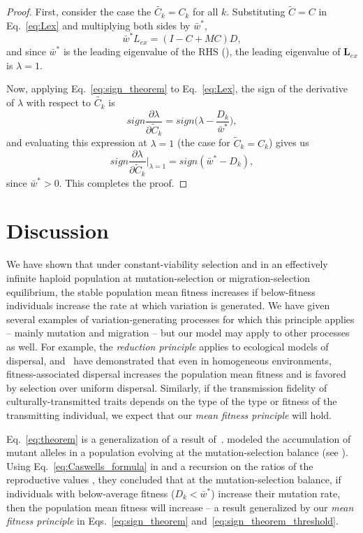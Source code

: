 \documentclass[9pt, a4paper, twocolumn]{extarticle}
\newcommand{\cl}{\mathbf{L}}
\begin{document}
\begin{proof}
First, consider the case the $\tilde{C_k} = C_k$ for all $k$.
Substituting $\tilde{C}=C$ in Eq.~\ref{eq:Lex} and multiplying both sides by $\bar{w}^*$,
\begin{equation}
\bar{w}^* L_{ex} = (I-C+MC) D,
\end{equation}
and since $\bar{w}^*$ is the leading eigenvalue of the RHS (),
the leading eigenvalue of $\cl_{ex}$ is $\lambda=1$.

Now, applying Eq.~\ref{eq:sign_theorem} to Eq.~\ref{eq:Lex}, the sign of the derivative of $\lambda$ with respect to $\tilde{C_k}$ is
\begin{equation}
sign \frac{\partial \lambda}{\partial \tilde{C}_k} =
sign\Big(\lambda - \frac{D_k}{\bar{w}^*}\Big),
\end{equation}
and evaluating this expression at $\lambda=1$ (the case for $\tilde{C}_k = C_k$) gives us
\begin{equation}
sign \frac{\partial \lambda}{\partial \tilde{C}_k}\bigg\rvert_{\lambda=1} = 
sign(\bar{w}^* - D_k),
\end{equation}
since $\bar{w}^*>0$.
This completes the proof.
\end{proof}

\section*{Discussion}

We have shown that under constant-viability selection and in an effectively infinite haploid population at mutation-selection or migration-selection equilibrium, the stable population mean fitness increases if below-fitness individuals increase the rate at which variation is generated.
We have given several examples of variation-generating processes for which this principle applies -- mainly mutation and migration -- but our model may apply to other processes as well.
For example, the \emph{reduction principle} applies to ecological models of dispersal, and~\citet{Gueijman2013} have demonstrated that even in homogeneous environments, fitness-associated dispersal increases the population mean fitness and is favored by selection over uniform dispersal.
Similarly, if the transmission fidelity of culturally-transmitted traits depends on the type of the type or fitness of the transmitting individual, we expect that our \emph{mean fitness principle} will hold.

Eq.~\ref{eq:theorem} is a generalization of a result of~\citet[Eq.~4]{Ram2012}.
\citeauthor{Ram2012} modeled the accumulation of mutant alleles in a population evolving at the mutation-selection balance (see ).
Using Eq.~\ref{eq:Caswells_formula} in  and a recursion on the ratios of the reproductive values \cite[see][eqs.~A5-6]{Ram2012}, they concluded that at the mutation-selection balance, if individuals with below-average fitness ($D_k < \bar{w}^*$) increase their mutation rate, then the population mean fitness will increase -- a result generalized by our \emph{mean fitness principle} in Eqs.~\ref{eq:sign_theorem} and~\ref{eq:sign_theorem_threshold}.
\end{document}
